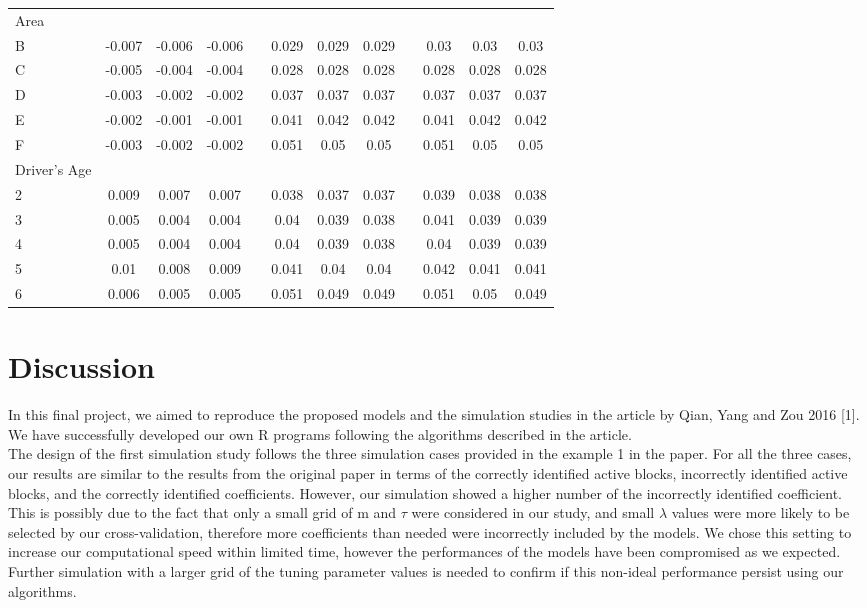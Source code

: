 \documentclass[paper=a4, fontsize=11pt]{scrartcl} %
\begin{document}
\begin{sidewaystable}[!htbp]
{\begin{tabular}{@{}lccclccclccc@{}}
Area &  &  &  &  &  &  &  &  &  &  &  \\
B & -0.007 & -0.006 & -0.006 &  & 0.029 & 0.029 & 0.029 &  & 0.03 & 0.03 & 0.03 \\
C & -0.005 & -0.004 & -0.004 &  & 0.028 & 0.028 & 0.028 &  & 0.028 & 0.028 & 0.028 \\
D & -0.003 & -0.002 & -0.002 &  & 0.037 & 0.037 & 0.037 &  & 0.037 & 0.037 & 0.037 \\
E & -0.002 & -0.001 & -0.001 &  & 0.041 & 0.042 & 0.042 &  & 0.041 & 0.042 & 0.042 \\
F & -0.003 & -0.002 & -0.002 &  & 0.051 & 0.05 & 0.05 &  & 0.051 & 0.05 & 0.05 \\
Driver's Age &  &  &  &  &  &  &  &  &  &  &  \\
2 & 0.009 & 0.007 & 0.007 &  & 0.038 & 0.037 & 0.037 &  & 0.039 & 0.038 & 0.038 \\
3 & 0.005 & 0.004 & 0.004 &  & 0.04 & 0.039 & 0.038 &  & 0.041 & 0.039 & 0.039 \\
4 & 0.005 & 0.004 & 0.004 &  & 0.04 & 0.039 & 0.038 &  & 0.04 & 0.039 & 0.039 \\
5 & 0.01 & 0.008 & 0.009 &  & 0.041 & 0.04 & 0.04 &  & 0.042 & 0.041 & 0.041 \\
6 & 0.006 & 0.005 & 0.005 &  & 0.051 & 0.049 & 0.049 &  & 0.051 & 0.05 & 0.049 \\ \bottomrule
\end{tabular}}
\end{sidewaystable}


\section*{\textbf{Discussion}}
In this final project, we aimed to reproduce the proposed models and the simulation studies in the article by Qian, Yang and Zou 2016 [1]. We have successfully developed our own R programs following the algorithms described in the article.\\

The design of the first simulation study follows the three simulation cases provided in the example 1 in the paper. For all the three cases, our results are similar to the results from the original paper in terms of the correctly identified active blocks, incorrectly identified active blocks, and the correctly identified coefficients. However, our simulation showed a higher number of the incorrectly identified coefficient. This is possibly due to the fact that only a small grid of m and $\tau$ were considered in our study, and small $\lambda$ values were more likely to be selected by our cross-validation, therefore more coefficients than needed were incorrectly included by the models. We chose this setting to increase our computational speed within limited time, however the performances of the models have been compromised as we expected. Further simulation with a larger grid of the tuning parameter values is needed to confirm if this non-ideal performance persist using our algorithms.\\
\end{document}
